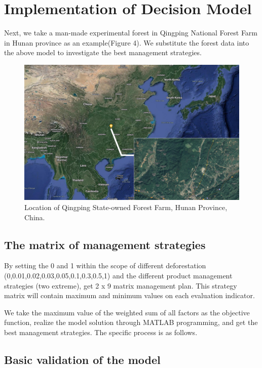 
\section{Implementation of Decision Model}

Next, we take a man-made experimental forest in Qingping National Forest Farm in Hunan province as an example(Figure 4). We substitute the forest data\cite{Hdata,TaiwaniaDensity,ToonaDensity} into the above model to investigate the best management strategies.

\begin{figure}[htp]
    \centering
    \includegraphics[width=15cm]{figs/map.png}
    \caption{Location of Qingping State-owned Forest Farm, Hunan Province, China.}
    \label{fig:my_label}
\end{figure}

\subsection{The matrix of management strategies}
By setting the 0 and 1 within the scope of different deforestation (0,0.01,0.02,0.03,0.05,0.1,0.3,0.5,1) and the different product management strategies (two extreme), get 2 x 9 matrix management plan. This strategy matrix will contain maximum and minimum values on each evaluation indicator.

We take the maximum value of the weighted sum of all factors as the objective function, realize the model solution through MATLAB programming, and get the best management  strategies. The specific process is as follows.

\subsection{Basic validation of the model}

